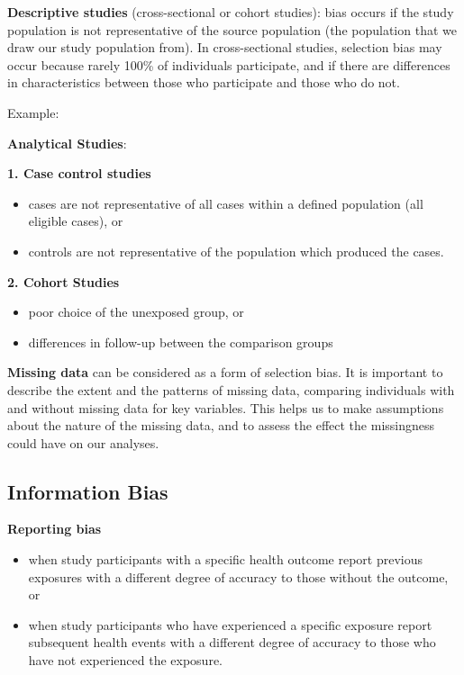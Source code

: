 \documentclass[
  letterpaper,
  DIV=11,
  numbers=noendperiod]{scrreprt}
\begin{document}
\textbf{Descriptive studies} (cross-sectional or cohort studies): bias
occurs if the study population is not representative of the source
population (the population that we draw our study population from). In
cross-sectional studies, selection bias may occur because rarely 100\%
of individuals participate, and if there are differences in
characteristics between those who participate and those who do not.

Example:

\textbf{Analytical Studies}:

\textbf{1. Case control studies}

\begin{itemize}
\item
  cases are not representative of all cases within a defined population
  (all eligible cases), or
\item
  controls are not representative of the population which produced the
  cases.
\end{itemize}

\textbf{2. Cohort Studies}

\begin{itemize}
\item
  poor choice of the unexposed group, or
\item
  differences in follow-up between the comparison groups
\end{itemize}

\textbf{Missing data} can be considered as a form of selection bias. It
is important to describe the extent and the patterns of missing data,
comparing individuals with and without missing data for key variables.
This helps us to make assumptions about the nature of the missing data,
and to assess the effect the missingness could have on our analyses.

\hypertarget{information-bias}{%
\subsection{Information Bias}\label{information-bias}}

\textbf{Reporting bias}

\begin{itemize}
\item
  when study participants with a specific health outcome report previous
  exposures with a different degree of accuracy to those without the
  outcome, or
\item
  when study participants who have experienced a specific exposure
  report subsequent health events with a different degree of accuracy to
  those who have not experienced the exposure.
\end{itemize}
\end{document}
